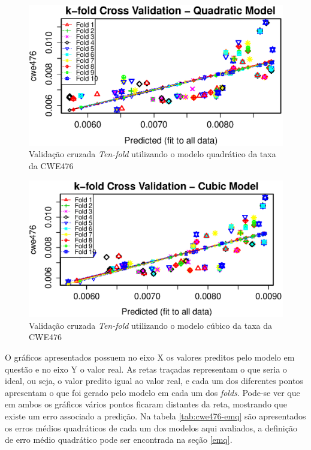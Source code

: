 \begin{figure}[h]
  \centering
  \includegraphics[width=1.0\textwidth]
      {figuras/cwe476-k-fold-quadratic.eps}
      \caption{Validação cruzada \textit{Ten-fold} utilizando o modelo
      quadrático da taxa da CWE476}
  \label{fig:cwe476-k-fold-quadratic}
\end{figure}

\begin{figure}[h]
  \centering
  \includegraphics[width=1.0\textwidth]
      {figuras/cwe476-k-fold-cubic.eps}
      \caption{Validação cruzada \textit{Ten-fold} utilizando o modelo
      cúbico da taxa da CWE476}
  \label{fig:cwe476-k-fold-cubic}
\end{figure}

O gráficos apresentados possuem no eixo X os valores preditos pelo modelo em
questão e no eixo Y o valor real. As retas traçadas representam o que seria o
ideal, ou seja, o valor predito igual ao valor real, e cada um dos diferentes
pontos apresentam o que foi gerado pelo modelo em cada um dos \textit{folds}.
Pode-se ver que em ambos os gráficos vários pontos ficaram distantes da reta,
mostrando que existe um erro associado a predição. Na tabela
\ref{tab:cwe476-emq} são apresentados os erros médios quadráticos de cada um dos
modelos aqui avaliados, a definição de erro médio quadrático pode ser encontrada
na seção \ref{emq}.

